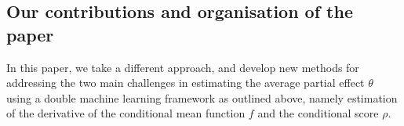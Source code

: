 \documentclass[aos]{imsart}
\begin{document}
	
	
	\subsection{Our contributions and organisation of the paper}
	In this paper, we take a different approach, and develop new methods for addressing the two main challenges in estimating the average partial effect $\theta$ using a double machine learning framework as outlined above, namely estimation of the derivative of the conditional mean function $f$ and the conditional score $\rho$.
	
\end{document}
